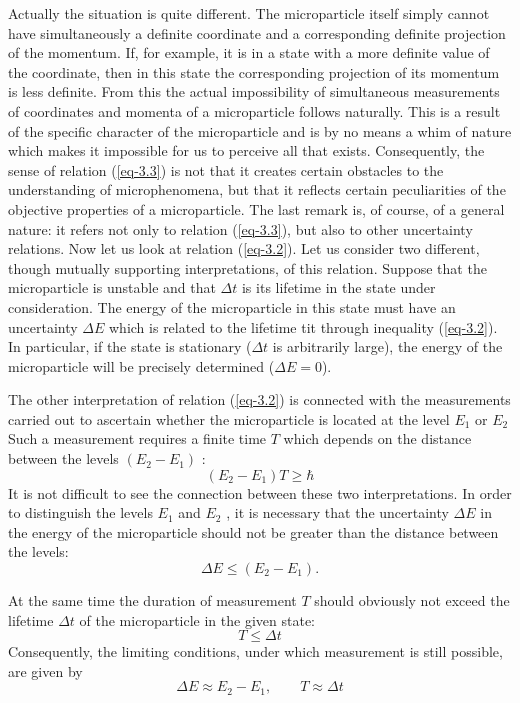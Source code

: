 \documentclass[a4paper,sfsidenotes,colorlinks=true]{tufte-book}
\numberwithin{equation}{section}
\numberwithin{figure}{section}
\begin{document}
Actually the situation is quite different. The microparticle itself
simply cannot have simultaneously a definite coordinate and a
corresponding definite projection of the momentum. If, for example, it
is in a state with a more definite value of the coordinate, then in
this state the corresponding projection of its momentum is less
definite. From this the actual impossibility of simultaneous
measurements of coordinates and momenta of a microparticle follows
naturally. This is a result of the specific character of the
microparticle and is by no means a whim of nature which makes it
impossible for us to perceive all that exists. Consequently, the sense
of relation (\ref{eq-3.3}) is not that it creates certain obstacles to
the understanding of microphenomena, but that it reflects certain
peculiarities of the objective properties of a microparticle. The last
remark is, of course, of a general nature: it refers not only to
relation (\ref{eq-3.3}), but also to other uncertainty relations. Now
let us look at relation (\ref{eq-3.2}). Let us consider two different, though
mutually supporting interpretations, of this relation. Suppose that
the microparticle is unstable and that $\Delta t$ is its lifetime in the
state under consideration. The energy of the microparticle in this
state must have an uncertainty $\Delta E$ which is related to the lifetime
tit through inequality (\ref{eq-3.2}). In particular, if the state is
stationary ($\Delta t$ is arbitrarily large), the energy of the microparticle
will be precisely determined ($\Delta E = 0$).  

The other interpretation of relation (\ref{eq-3.2}) is connected with the
measurements carried out to ascertain whether the microparticle is
located at the level $E_{1}$ or $E_{2}$ Such a measurement requires a finite
time $T$ which depends on the distance between the levels $(E_{2}- E_{1})$ :
\begin{equation}%
(E_{2} - E_{1}) T \geqslant  \hbar  
\tag{3.2a}
\label{eq-3.2a} 
\end{equation}
It is not difficult to see the connection between these two
interpretations. In order to distinguish the levels $E_{1}$ and $E_{2}$ , it is
necessary that the uncertainty $\Delta E$ in the energy of the microparticle
should not be greater than the distance between the levels:
\begin{equation*}
\Delta E \leqslant (E_{2} - E_{1}). 
\end{equation*}

At the same time the duration of measurement $T$ should obviously not
exceed the lifetime $\Delta t$ of the microparticle in the given state:
\begin{equation*}
T \leqslant  \Delta t
\end{equation*}
Consequently, the limiting conditions, under which measurement is
still possible, are given by
\begin{equation*}
\Delta E \approx E_{2} - E_{1}, \quad \quad  T \approx  \Delta t
\end{equation*}
\end{document}
